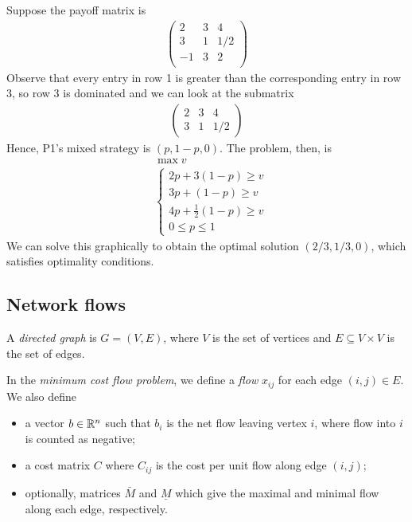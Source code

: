 \documentclass{../template/note}
\begin{document}
    \begin{example*}
        Suppose the payoff matrix is
        \begin{align*}
            \begin{pmatrix}
                2 & 3 & 4 \\
                3 & 1 & 1/2 \\
                -1 & 3 & 2 \\
            \end{pmatrix}
        \end{align*}
        Observe that every entry in row 1 is greater than the corresponding entry in row 3, so row 3 is dominated and we can look at the submatrix
        \begin{align*}
            \begin{pmatrix}
                2 & 3 & 4 \\
                3 & 1 & 1/2
            \end{pmatrix}
        \end{align*}
        Hence, P1's mixed strategy is $(p, 1-p, 0)$. The problem, then, is
        \begin{align*}
            &\max v \\
            &\begin{cases}
                2p + 3(1-p) \geq v \\
                3p + (1-p) \geq v \\
                4p + \frac 1 2 (1-p) \geq v \\
                0 \leq p \leq 1
            \end{cases}
        \end{align*}
        We can solve this graphically to obtain the optimal solution $(2/3, 1/3, 0)$, which satisfies optimality conditions.       
    \end{example*}
    
    \subsection{Network flows}

    \begin{definition}
        A \emph{directed graph} is $G = (V, E)$, where $V$ is the set of vertices and $E \subseteq V \times V$ is the set of edges.
    \end{definition}
    
    In the \emph{minimum cost flow problem}, we define a \emph{flow} $x_{ij}$ for each edge $(i, j) \in E$. We also define
    \begin{itemize}
        \item a vector $b \in \mathbb R^n$ such that $b_i$ is the net flow leaving vertex $i$, where flow into $i$ is counted as negative;
        \item a cost matrix $C$ where $C_{ij}$ is the cost per unit flow along edge $(i, j)$;
        \item optionally, matrices $\bar M$ and $\underline M$ which give the maximal and minimal flow along each edge, respectively.
    \end{itemize}
    
\end{document}
